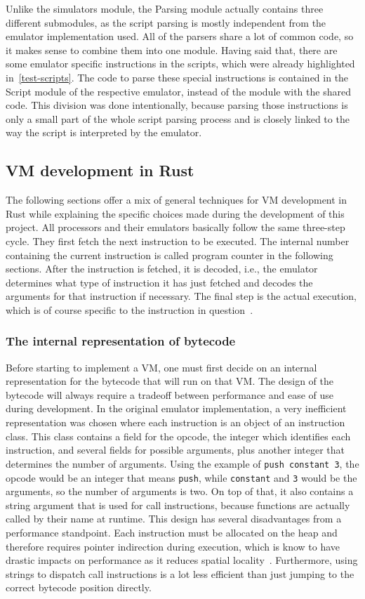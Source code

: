 Unlike the simulators module, the Parsing module actually contains three different submodules, as the script parsing is mostly independent from the emulator implementation used.
All of the parsers share a lot of common code, so it makes sense to combine them into one module.
Having said that, there are some emulator specific instructions in the scripts, which were already highlighted in~\cref{test-scripts}.
The code to parse these special instructions is contained in the Script module of the respective emulator, instead of the module with the shared code.
This division was done intentionally, because parsing those instructions is only a small part of the whole script parsing process and is closely linked to the way the script is interpreted by the emulator.

\subsection{VM development in Rust} \label{rust-vm-dev}
The following sections offer a mix of general techniques for VM development in Rust while explaining the specific choices made during the development of this project.
All processors and their emulators basically follow the same three-step cycle. They first fetch the next instruction to be executed. The internal number containing the current instruction is called program counter in the following sections.
After the instruction is fetched, it is decoded, i.e., the emulator determines what type of instruction it has just fetched and decodes the arguments for that instruction if necessary.
The final step is the actual execution, which is of course specific to the instruction in question~\cite{nystrom2021crafting}.

\subsubsection{The internal representation of bytecode}
Before starting to implement a VM, one must first decide on an internal representation for the bytecode that will run on that VM.
The design of the bytecode will always require a tradeoff between performance and ease of use during development.
In the original emulator implementation, a very inefficient representation was chosen where each instruction is an object of an instruction class.
This class contains a field for the opcode, the integer which identifies each instruction, and several fields for possible arguments, plus another integer that determines the number of arguments.
Using the example of \verb+push constant 3+, the opcode would be an integer that means \verb+push+, while \verb+constant+ and \verb+3+ would be the arguments, so the number of arguments is two.
On top of that, it also contains a string argument that is used for call instructions, because functions are actually called by their name at runtime.
This design has several disadvantages from a performance standpoint.
Each instruction must be allocated on the heap and therefore requires pointer indirection during execution, which is know to have drastic impacts on performance as it reduces spatial locality~\cite{6498541}.
Furthermore, using strings to dispatch call instructions is a lot less efficient than just jumping to the correct bytecode position directly.

